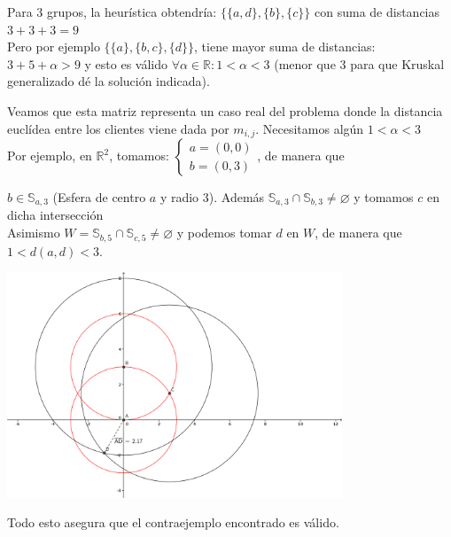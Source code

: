 \documentclass[a4paper, 11pt]{article} %
\let\emptyset\varnothing
\begin{document}
    Para 3 grupos, la heurística obtendría: $\{\{a,d\},\{b\},\{c\}\}$ con suma de distancias $3+3+3=9$\\
    
    Pero por ejemplo $\{\{a\},\{b,c\},\{d\}\}$, tiene mayor suma de distancias:\\
    $3+5+\alpha>9 $ y esto es válido $\forall \alpha\in \mathbb{R}:  1<\alpha<3 $ (menor que 3 para que Kruskal generalizado dé
    la solución indicada).
    
    Veamos que esta matriz representa un caso real del problema donde la distancia euclídea entre los clientes
    viene dada por $m_{i,j}$. Necesitamos algún $1<\alpha<3$\\
    
    Por ejemplo, en $\mathbb{R}^2$, tomamos: $\left\{\begin{array}{l}
                                               a=(0,0) \\
                                               b=(0,3)
                                              \end{array}\right.$, de manera que
                                              
    $b\in \mathbb{S}_{a,3}$ (Esfera de centro $a$ y radio $3$).
    Además $\mathbb{S}_{a,3}\cap \mathbb{S}_{b,3}\neq \emptyset$
    y tomamos $c$ en dicha intersección\\
    
    Asimismo $W=\mathbb{S}_{b,5}\cap \mathbb{S}_{c,5}\neq \emptyset$
    y podemos tomar $d$ en $W$, de manera que $1<d(a,d)<3$.

     \begin{center}
	\includegraphics[width=10cm]{ej3.png}
     \end{center}  
     
    Todo esto asegura que el contraejemplo encontrado es válido.
    
\end{document}

